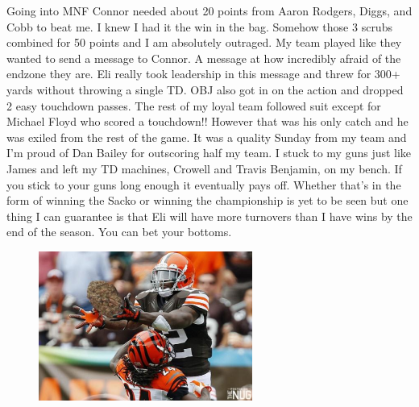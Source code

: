 \documentclass[11pt,letterpaper]{article}
\begin{document}
\newpage
{}
\par\noindent Going into MNF Connor needed about 20 points from Aaron Rodgers, Diggs, and Cobb to beat me. I knew I had it the win in the bag. Somehow those 3 scrubs combined for 50 points and I am absolutely outraged. My team played like they wanted to send a message to Connor. A message at how incredibly afraid of the endzone they are. Eli really took leadership in this message and threw for 300+ yards without throwing a single TD. OBJ also got in on the action and dropped 2 easy touchdown passes. The rest of my loyal team followed suit except for Michael Floyd who scored a touchdown!! However that was his only catch and he was exiled from the rest of the game. It was a quality Sunday from my team and I'm proud of Dan Bailey for outscoring half my team. I stuck to my guns just like James and left my TD machines, Crowell and Travis Benjamin, on my bench. If you stick to your guns long enough it eventually pays off. Whether that's in the form of winning the Sacko or winning the championship is yet to be seen but one thing I can guarantee is that Eli will have more turnovers than I have wins by the end of the season. You can bet your bottoms.
\begin{figure}
\centering
\includegraphics[width=0.625\textwidth]{week2-gordon.png}
\label{fig:week2-gordon}
\end{figure} 
\bigskip
\end{document}
